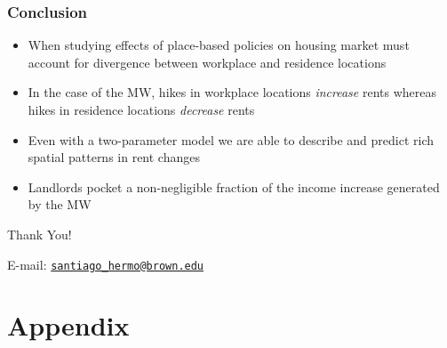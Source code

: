 \documentclass[aspectratio=169, t]{beamer}
\begin{document}
\begin{frame}
    \frametitle{Conclusion}
    
    \begin{itemize}
        \item When studying effects of place-based policies on housing market must account for 
        divergence between workplace and residence locations
         \vspace{2mm}
         \item In the case of the MW, hikes in workplace locations \textit{increase} rents
         whereas hikes in residence locations \textit{decrease} rents
         \vspace{2mm}
         \item Even with a two-parameter model we are able to describe and predict rich spatial patterns in rent changes
         \vspace{2mm}
         \item Landlords pocket a non-negligible fraction of the income increase generated by the MW
    \end{itemize}
    
\end{frame}

\begin{frame}[c]
    \Large Thank You!

    \vspace{3mm}
    \normalsize E-mail: \texttt{\url{santiago_hermo@brown.edu}}
\end{frame}


\appendix

\renewcommand\thetable{\thesection.\arabic{table}}
\renewcommand\thefigure{\thesection.\arabic{figure}} 
\setcounter{table}{0}
\setcounter{figure}{0}

\section{Appendix}
\end{document}
